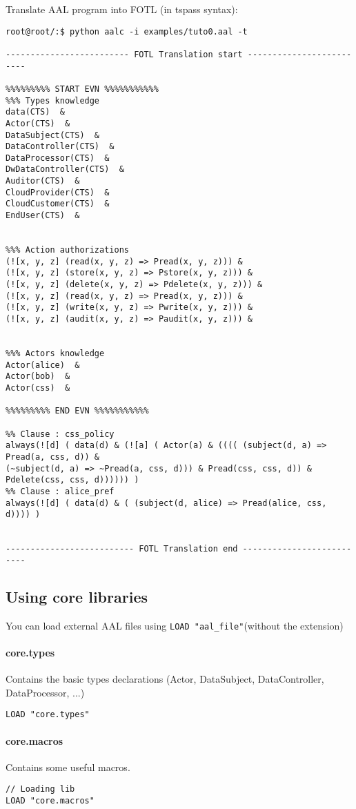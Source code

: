 \begin{itemize}
{	\item Translate AAL program into FOTL (in tspass syntax):
\begin{lstlisting}
root@root/:$ python aalc -i examples/tuto0.aal -t

------------------------- FOTL Translation start -------------------------

%%%%%%%%% START EVN %%%%%%%%%%%
%%% Types knowledge
data(CTS)  &
Actor(CTS)  &
DataSubject(CTS)  &
DataController(CTS)  &
DataProcessor(CTS)  &
DwDataController(CTS)  &
Auditor(CTS)  &
CloudProvider(CTS)  &
CloudCustomer(CTS)  &
EndUser(CTS)  &


%%% Action authorizations
(![x, y, z] (read(x, y, z) => Pread(x, y, z))) &
(![x, y, z] (store(x, y, z) => Pstore(x, y, z))) &
(![x, y, z] (delete(x, y, z) => Pdelete(x, y, z))) &
(![x, y, z] (read(x, y, z) => Pread(x, y, z))) &
(![x, y, z] (write(x, y, z) => Pwrite(x, y, z))) &
(![x, y, z] (audit(x, y, z) => Paudit(x, y, z))) &


%%% Actors knowledge
Actor(alice)  &
Actor(bob)  &
Actor(css)  &

%%%%%%%%% END EVN %%%%%%%%%%%

%% Clause : css_policy
always(![d] ( data(d) & (![a] ( Actor(a) & (((( (subject(d, a) => Pread(a, css, d)) &
(~subject(d, a) => ~Pread(a, css, d))) & Pread(css, css, d)) & Pdelete(css, css, d)))))) )
%% Clause : alice_pref
always(![d] ( data(d) & ( (subject(d, alice) => Pread(alice, css, d)))) )


-------------------------- FOTL Translation end --------------------------
\end{lstlisting}
}
\end{itemize}


\subsection{Using core libraries}
You can load external AAL files using \texttt{LOAD "aal\_file"}(without the extension) 

\paragraph{core.types} Contains the basic types declarations (Actor, DataSubject, DataController, DataProcessor, ...)
\begin{lstlisting}
LOAD "core.types"
\end{lstlisting}

\paragraph{core.macros} Contains some useful macros.
\begin{lstlisting}
// Loading lib
LOAD "core.macros"
\end{lstlisting}




